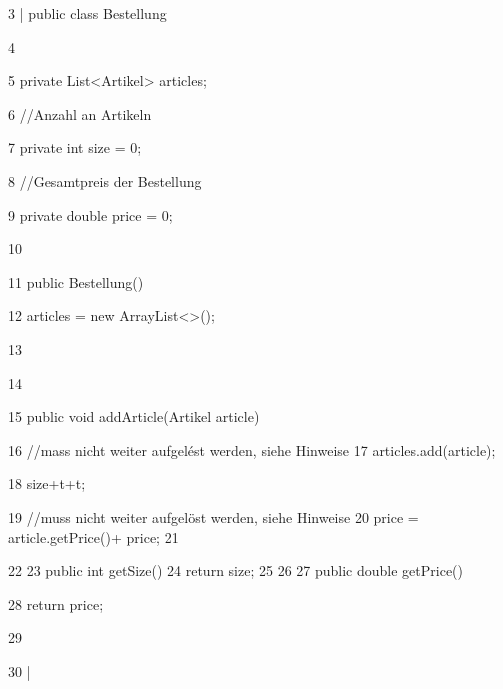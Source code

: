 \documentclass{lehramt-informatik-aufgabe}
\begin{document}
3 | public class Bestellung {

4

5 private List<Artikel> articles;

6 //Anzahl an Artikeln

7 private int size = 0;

8 //Gesamtpreis der Bestellung

9 private double price = 0;

10

11 public Bestellung() {

12 articles = new ArrayList<>();

13 }

14

15 public void addArticle(Artikel article) {
16 //mass nicht weiter aufgelést werden, siehe Hinweise
17 articles.add(article);

18 size+t+t;

19 //muss nicht weiter aufgelöst werden, siehe Hinweise
20 price = article.getPrice()+ price;
21 }

22
23 public int getSize() {
24 return size;
25 }
26
27 public double getPrice() {

28 return price;

29 }

30 | }
\end{document}
